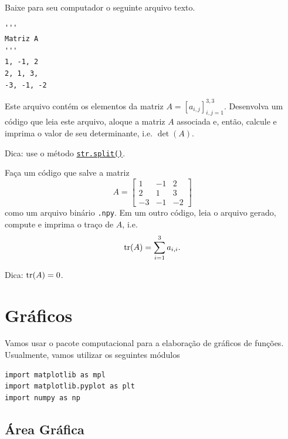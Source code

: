 \begin{exer}
  Baixe para seu computador o seguinte arquivo texto.
\begin{lstlisting}[caption=mat.txt]
'''
Matriz A
'''
1, -1, 2
2, 1, 3,
-3, -1, -2
\end{lstlisting}
  Este arquivo contém os elementos da matriz $A = [a_{i,j}]_{i,j=1}^{3,3}$. Desenvolva um código que leia este arquivo, aloque a matriz $A$ associada e, então, calcule e imprima o valor de seu determinante, i.e. $\det(A)$.
\end{exer}
\begin{resp}
  Dica: use o método \href{https://docs.python.org/3/library/stdtypes.html#str.split}{\lstinline+str.split()+}.
\end{resp}

\begin{exer}
  Faça um código que salve a matriz
  \begin{equation}
    A =
    \begin{bmatrix}
      1 & -1 & 2\\
      2 & 1 & 3\\
      -3 & -1 & -2
    \end{bmatrix}
  \end{equation}
  como um arquivo binário \lstinline+.npy+. Em um outro código, leia o arquivo gerado, compute e imprima o traço de $A$, i.e.
  \begin{equation}
    \operatorname{tr}(A) = \sum_{i=1}^3 a_{i,i}.
  \end{equation}
\end{exer}
\begin{resp}
  Dica: $\operatorname{tr}(A) = 0$.
\end{resp}

\section{Gráficos}\label{cap_ag_sec_graf}

Vamos usar o pacote computacional {\matplotlib} para a elaboração de gráficos de funções. Usualmente, vamos utilizar os seguintes módulos {\python}
\begin{lstlisting}
import matplotlib as mpl
import matplotlib.pyplot as plt
import numpy as np
\end{lstlisting}

\subsection{Área Gráfica}

